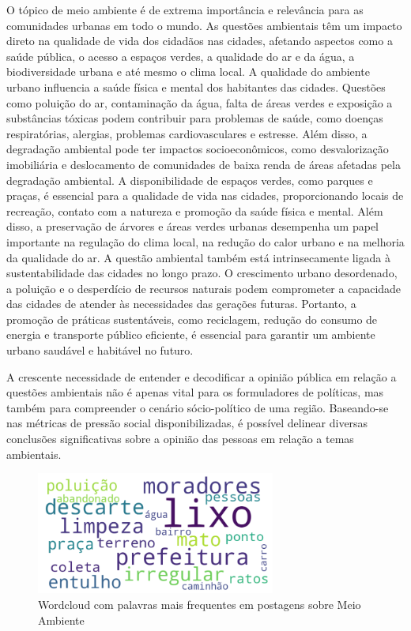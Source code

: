 O tópico de meio ambiente é de extrema importância e relevância para as comunidades urbanas em todo o mundo. As questões ambientais têm um impacto direto na qualidade de vida dos cidadãos nas cidades, afetando aspectos como a saúde pública, o acesso a espaços verdes, a qualidade do ar e da água, a biodiversidade urbana e até mesmo o clima local. A qualidade do ambiente urbano influencia a saúde física e mental dos habitantes das cidades. Questões como poluição do ar, contaminação da água, falta de áreas verdes e exposição a substâncias tóxicas podem contribuir para problemas de saúde, como doenças respiratórias, alergias, problemas cardiovasculares e estresse. Além disso, a degradação ambiental pode ter impactos socioeconômicos, como desvalorização imobiliária e deslocamento de comunidades de baixa renda de áreas afetadas pela degradação ambiental. A disponibilidade de espaços verdes, como parques e praças, é essencial para a qualidade de vida nas cidades, proporcionando locais de recreação, contato com a natureza e promoção da saúde física e mental. Além disso, a preservação de árvores e áreas verdes urbanas desempenha um papel importante na regulação do clima local, na redução do calor urbano e na melhoria da qualidade do ar. A questão ambiental também está intrinsecamente ligada à sustentabilidade das cidades no longo prazo. O crescimento urbano desordenado, a poluição e o desperdício de recursos naturais podem comprometer a capacidade das cidades de atender às necessidades das gerações futuras. Portanto, a promoção de práticas sustentáveis, como reciclagem, redução do consumo de energia e transporte público eficiente, é essencial para garantir um ambiente urbano saudável e habitável no futuro.

A crescente necessidade de entender e decodificar a opinião pública em relação a questões ambientais não é apenas vital para os formuladores de políticas, mas também para compreender o cenário sócio-político de uma região. Baseando-se nas métricas de pressão social disponibilizadas, é possível delinear diversas conclusões significativas sobre a opinião das pessoas em relação a temas ambientais.

\begin{figure}[htb]
	\centering
	\includegraphics[width=0.7\textwidth]{images/wordcloud_environment.png}
	\caption{Wordcloud com palavras mais frequentes em postagens sobre Meio Ambiente}
	\label{fig:wordcloud_environment}
\end{figure}

